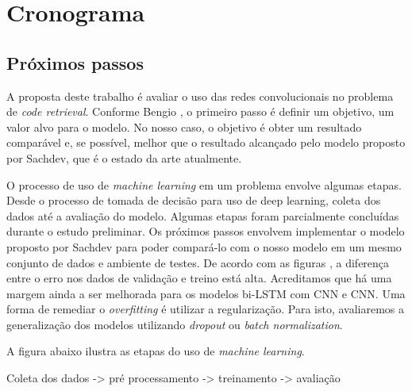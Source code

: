 \chapter{Cronograma}
\label{cap:cronograma}

\section{Próximos passos}

A proposta deste trabalho é avaliar o uso das redes convolucionais no problema de \textit{code retrieval}. Conforme Bengio , o primeiro passo é definir um objetivo, um valor alvo para o modelo. No nosso caso, o objetivo é obter um resultado comparável e, se possível, melhor que o resultado alcançado pelo modelo proposto por Sachdev, que é o estado da arte atualmente.

O processo de uso de \textit{machine learning} em um problema envolve algumas etapas. Desde o processo de tomada de decisão para uso de deep learning, coleta dos dados até a avaliação do modelo. Algumas etapas foram parcialmente concluídas durante o estudo preliminar. Os próximos passos envolvem implementar o modelo proposto por Sachdev para poder compará-lo com o nosso modelo em um mesmo conjunto de dados e ambiente de testes. De acordo com as figuras , a diferença entre o erro nos dados de validação e treino está alta. Acreditamos que há uma margem ainda a ser melhorada para os modelos bi-LSTM com CNN e CNN. Uma forma de remediar o \textit{overfitting} é utilizar a regularização. Para isto, avaliaremos a generalização dos modelos utilizando \textit{dropout} ou \textit{batch normalization}.

A figura abaixo ilustra as etapas do uso de \textit{machine learning}.


Coleta dos dados -> pré processamento -> treinamento -> avaliação 








